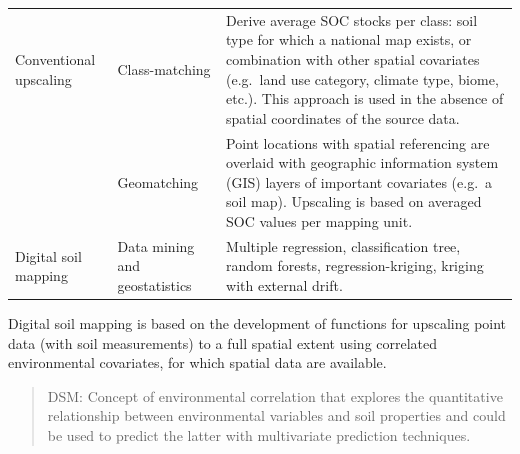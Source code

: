 \documentclass[10pt,b5paper,]{book}
\theoremstyle{definition}
\theoremstyle{definition}
\theoremstyle{definition}
\theoremstyle{remark}
\begin{document}
\begin{longtable}[]{@{}lll@{}}
\toprule
\endhead
\begin{minipage}[t]{0.20\columnwidth}\raggedright
Conventional upscaling \citep{lettens2004soil}\strut
\end{minipage} & \begin{minipage}[t]{0.27\columnwidth}\raggedright
Class-matching\strut
\end{minipage} & \begin{minipage}[t]{0.44\columnwidth}\raggedright
Derive average SOC stocks per class: soil type for which a national map
exists, or combination with other spatial covariates (e.g.~land use
category, climate type, biome, etc.). This approach is used in the
absence of spatial coordinates of the source data.\strut
\end{minipage}\tabularnewline
\begin{minipage}[t]{0.20\columnwidth}\raggedright
\strut
\end{minipage} & \begin{minipage}[t]{0.27\columnwidth}\raggedright
Geomatching\strut
\end{minipage} & \begin{minipage}[t]{0.44\columnwidth}\raggedright
Point locations with spatial referencing are overlaid with geographic
information system (GIS) layers of important covariates (e.g.~a soil
map). Upscaling is based on averaged SOC values per mapping unit.\strut
\end{minipage}\tabularnewline
\begin{minipage}[t]{0.20\columnwidth}\raggedright
Digital soil mapping \citep{dobos2006digital}\strut
\end{minipage} & \begin{minipage}[t]{0.27\columnwidth}\raggedright
Data mining and geostatistics\strut
\end{minipage} & \begin{minipage}[t]{0.44\columnwidth}\raggedright
Multiple regression, classification tree, random forests,
regression-kriging, kriging with external drift.\strut
\end{minipage}\tabularnewline
\bottomrule
\end{longtable}

Digital soil mapping is based on the development of functions for
upscaling point data (with soil measurements) to a full spatial extent
using correlated environmental covariates, for which spatial data are
available.

\begin{quote}
DSM: Concept of environmental correlation that explores the quantitative
relationship between environmental variables and soil properties and
could be used to predict the latter with multivariate prediction
techniques.
\end{quote}
\end{document}
